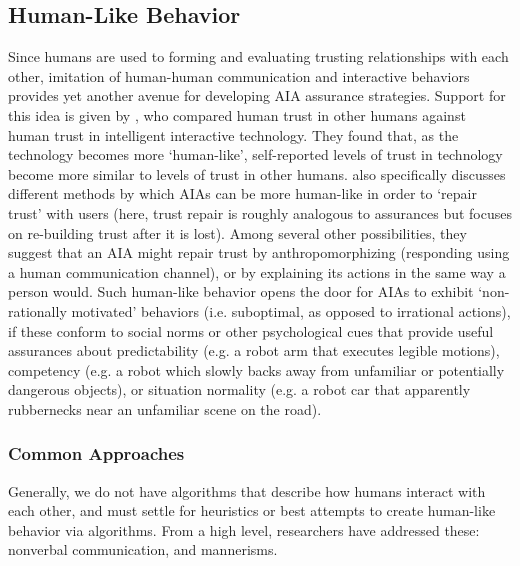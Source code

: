 \subsection{Human-Like Behavior} \label{sec:human_behavior}
Since humans are used to forming and evaluating trusting relationships with each other, imitation of human-human communication and interactive behaviors provides yet another avenue for developing AIA assurance strategies. 
Support for this idea is given by \citet{Tripp2011-rx}, who compared human trust in other humans against human trust in intelligent interactive technology. %
They found that, as the technology becomes more `human-like', self-reported levels of trust in technology become more similar to levels of trust in other humans.
%
\citet{De_Visser2018-kd} also specifically discusses different methods by which AIAs can be more human-like in order to `repair trust' with users (here, trust repair is roughly analogous to assurances but focuses on re-building trust after it is lost). Among several other possibilities, they suggest that an AIA might repair trust by anthropomorphizing (responding using a human communication channel), or by explaining its actions in the same way a person would. %
Such human-like behavior opens the door for AIAs to exhibit `non-rationally motivated' behaviors (i.e. suboptimal, as opposed to irrational actions), if these conform to social norms or other psychological cues that provide useful assurances about predictability (e.g. a robot arm that executes legible motions), competency (e.g. a robot which slowly backs away from unfamiliar or potentially dangerous objects), or situation normality (e.g. a robot car that apparently rubbernecks near an unfamiliar scene on the road). 

\subsubsection{Common Approaches}
Generally, we do not have algorithms that describe how humans interact with each other, and must settle for heuristics or best attempts to create human-like behavior via algorithms. From a high level, researchers have addressed these: nonverbal communication, and mannerisms.

